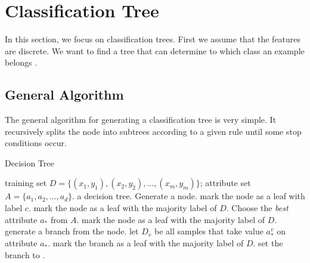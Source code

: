 \section{Classification Tree}
In this section, we focus on classification trees. First we assume that the features are discrete. We want to
find a tree that can determine to which class an example belongs .
\subsection{General Algorithm}
The general algorithm for generating a classification tree is very simple. It recursively splits the
node into subtrees according to a given rule until some stop conditions occur.
\begin{algorithm}
    \caption{Decision Tree}\label{decision_tree}
    \begin{algorithmic}[1]
        \Require training set $D = \{(x_1, y_1), (x_2, y_2), \ldots, (x_m, y_m)
        \}$; attribute set $A = \{a_1, a_2, \ldots, a_d\}$.
        \Ensure a decision tree.
            \State Generate a node.
             
                \State mark the node as a leaf with label $c$.
                \State \Return
            \EndIf
                \State mark the node as a leaf with the majority label of $D$. 
                \State \Return
            \EndIf
            \State Choose the \textit{best} attribute $a_*$ from $A$.\label{measurement}
            \label{worthSplitting}
                \State mark the node as a leaf with the majority label of $D$.
                \State \Return
            \Else
                    \State generate a branch from the node.
                    \State let $D_v$ be all samples that take value $a_*^v$ on attribute
                    $a_*$.
                     
                        \State mark the branch as a leaf with the majority label of 
                        $D$.
                        \State \Return
                    \Else
                        \State set the branch to .
                    \EndIf
                \EndFor
            \EndIf
        \EndProcedure
    \end{algorithmic}
\end{algorithm}

